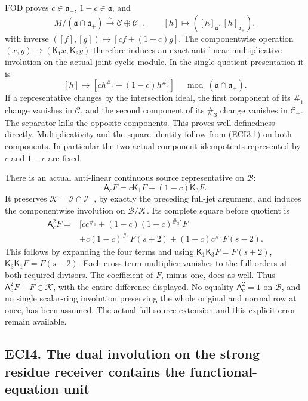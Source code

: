 FOD proves \(c\in\mathfrak a_+\), \(1-c\in\mathfrak a\), and \[
M/(\mathfrak a\cap\mathfrak a_+)\xrightarrow{\sim}
\mathscr C\oplus\mathscr C_+,
\qquad[h]\mapsto([h]_{\mathfrak a},[h]_{\mathfrak a_+}),
\tag{ECI3.1}
\] with inverse \(([f],[g])\mapsto[cf+(1-c)g]\). The componentwise
operation \((x,y)\mapsto(\mathsf K_1x,\mathsf K_3y)\) therefore induces
an exact anti-linear multiplicative involution on the actual joint
cyclic module. In the single quotient presentation it is \[
[h]\longmapsto[c h^{\#_1}+(1-c)h^{\#_3}]
\quad\bmod(\mathfrak a\cap\mathfrak a_+).
\tag{ECI3.2}
\] If a representative changes by the intersection ideal, the first
component of its \(\#_1\) change vanishes in \(\mathscr C\), and the
second component of its \(\#_3\) change vanishes in \(\mathscr C_+\).
The separator kills the opposite components. This proves
well-definedness directly. Multiplicativity and the square identity
follow from (ECI3.1) on both components. In particular the two actual
component idempotents represented by \(c\) and \(1-c\) are fixed.

There is an actual anti-linear continuous source representative on
\(\mathcal B\): \[
\mathsf A_cF=c\mathsf K_1F+(1-c)\mathsf K_3F.
\tag{ECI3.3}
\] It preserves \(\mathcal K=\mathcal I\cap\mathcal I_+\), by exactly
the preceding full-jet argument, and induces the componentwise
involution on \(\mathcal B/\mathcal K\). Its complete square before
quotient is \[
\begin{aligned}
\mathsf A_c^2F={}&
\bigl[c c^{\#_1}+(1-c)(1-c)^{\#_3}\bigr]F\\
&+c(1-c)^{\#_1}F(s+2)
+(1-c)c^{\#_3}F(s-2).
\end{aligned}
\tag{ECI3.4}
\] This follows by expanding the four terms and using
\(\mathsf K_1\mathsf K_3F=F(s+2)\), \(\mathsf K_3\mathsf K_1F=F(s-2)\).
Each cross-term multiplier vanishes to the full orders at both required
divisors. The coefficient of \(F\), minus one, does as well. Thus
\(\mathsf A_c^2F-F\in\mathcal K\), with the entire difference displayed.
No equality \(\mathsf A_c^2=1\) on \(\mathcal B\), and no single
scalar-ring involution preserving the whole original and normal row at
once, has been assumed. The actual full-source extension and this
explicit error remain available.

\subsection{ECI4. The dual involution on the strong residue receiver
contains the functional-equation
unit}\label{eci4.-the-dual-involution-on-the-strong-residue-receiver-contains-the-functional-equation-unit}

